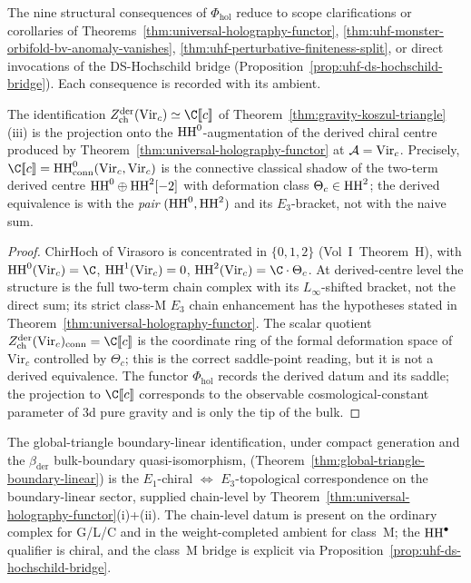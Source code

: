 The nine structural consequences of $\Phi_{\mathrm{hol}}$
reduce to scope clarifications or corollaries of
Theorems~\ref{thm:universal-holography-functor},
\ref{thm:uhf-monster-orbifold-bv-anomaly-vanishes},
\ref{thm:uhf-perturbative-finiteness-split}, or direct
invocations of the DS-Hochschild bridge
(Proposition~\ref{prop:uhf-ds-hochschild-bridge}). Each
consequence is recorded with its ambient.

\begin{proposition}
\label{prop:uhf-koszul-triangle-projection}
The identification $\Zder(\mathrm{Vir}_c) \simeq \C[\![c]\!]$ of
Theorem~\ref*{thm:gravity-koszul-triangle}(iii) is the
projection onto the $\mathrm{HH}^0$-augmentation of the derived chiral centre
produced by
Theorem~\ref{thm:universal-holography-functor} at
$\mathcal{A} = \mathrm{Vir}_c$. Precisely,
$\C[\![c]\!] = \HH^0_{\mathrm{conn}}(\mathrm{Vir}_c, \mathrm{Vir}_c)$
is the connective classical shadow of the two-term derived centre
$\mathrm{HH}^0 \oplus \mathrm{HH}^2[-2]$ with deformation class
$\Theta_c \in \mathrm{HH}^2$; the derived equivalence is with the
\emph{pair} $(\mathrm{HH}^0, \mathrm{HH}^2)$ and its $E_3$-bracket, not with the
naive sum.
\end{proposition}

\begin{proof}
ChirHoch of Virasoro is concentrated in $\{0,1,2\}$
(Vol~I~Theorem~H), with $\HH^0(\mathrm{Vir}_c) = \C$,
$\mathrm{HH}^1(\mathrm{Vir}_c) = 0$, $\HH^2(\mathrm{Vir}_c) =
\C \cdot \Theta_c$. At derived-centre level the structure is the full
two-term chain complex with its $L_\infty$-shifted bracket, not the
	direct sum; its strict class-M $E_3$ chain enhancement has the
	hypotheses stated in
	Theorem~\ref{thm:universal-holography-functor}. The scalar quotient
$\Zder(\mathrm{Vir}_c)_{\mathrm{conn}} = \C[\![c]\!]$ is the
coordinate ring of the formal deformation space of $\mathrm{Vir}_c$
controlled by $\Theta_c$; this is the correct saddle-point
reading, but it is not a derived equivalence. The functor
$\Phi_{\mathrm{hol}}$ records the derived datum and its saddle;
the projection to $\C[\![c]\!]$ corresponds to the observable
cosmological-constant parameter of 3d pure gravity and is only the
tip of the bulk.
\end{proof}

\begin{proposition}
\label{prop:uhf-global-triangle}
The global-triangle boundary-linear identification, under compact
generation and the $\beta_{\mathrm{der}}$ bulk-boundary
quasi-isomorphism,
(Theorem~\ref{thm:global-triangle-boundary-linear}) is the
$E_1$-chiral $\Leftrightarrow$
$E_3$-topological correspondence on the boundary-linear sector,
supplied chain-level by
Theorem~\ref{thm:universal-holography-functor}(i)+(ii). The
chain-level datum is present on the ordinary complex for G/L/C and in
the weight-completed ambient for class~M; the $\mathrm{HH}^\bullet$ qualifier
is chiral, and the class~M bridge is explicit via
Proposition~\ref{prop:uhf-ds-hochschild-bridge}.
\end{proposition}

